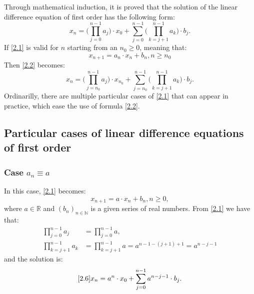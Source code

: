 \documentclass[a4paper,11pt]{report}
\newcommand{\R}{\mathbb{R}}
\begin{document}
Through mathematical induction, it is proved that the solution of the linear difference equation of first order has the following form:
\begin{equation}\label{2.2}
 x_{n}=\bigg( \prod_{j=0}^{n-1} a_{j} \bigg) \cdot x_{0} + \sum_{j=0}^{n-1} \bigg( \prod_{k=j+1}^{n-1} a_{k} \bigg)\cdot b_{j}.
\end{equation}
If \eqref{2.1} is valid for $n$ starting from an $n_{0} \geq 0$, meaning that:
\begin{equation}\label{2.3}
 x_{n+1}=a_{n}\cdot x_{n}+b_{n}, n\geq n_{0}
\end{equation}
Then \eqref{2.2} becomes:
\begin{equation}
 x_{n}=\bigg( \prod_{j=n_{0}}^{n-1} a_{j} \bigg) \cdot x_{n_{0}} + \sum_{j=n_{0}}^{n-1} \bigg( \prod_{k=j+1}^{n-1} a_{k} \bigg)\cdot b_{j}.
\end{equation}
Ordinarilly, there are multiple particular cases of \eqref{2.1} that can appear in practice, which ease the use of formula \eqref{2.2}.
\subsection{Particular cases of linear difference equations of first order}
\subsubsection{Case $a_{n}\equiv a$} \label{i}
In this case, \eqref{2.1} becomes:
\begin{equation}
\label{2.6}
 x_{n+1}=a\cdot x_{n}+b_{n}, n\geq 0,
\end{equation}
where $a\in \R$ and $(b_{n})_{n\in\mathbb{N}}$ is a given series of real numbers.
From \eqref{2.1} we have that:
\begin{align*}
 \prod_{j=0}^{n-1} a_{j} &=\prod_{j=0}^{n-1} a,\\
 \prod_{k=j+1}^{n-1} a_{k}&=\prod_{k=j+1}^{n-1} a=a^{n-1-(j+1)+1}=a^{n-j-1}
\end{align*}
and the solution is:
\begin{equation}\eqref{2.6}
 x_{n}=a^{n}\cdot x_{0}+\sum_{j=0}^{n-1} a^{n-j-1}\cdot b_{j}.
\end{equation}
\end{document}
